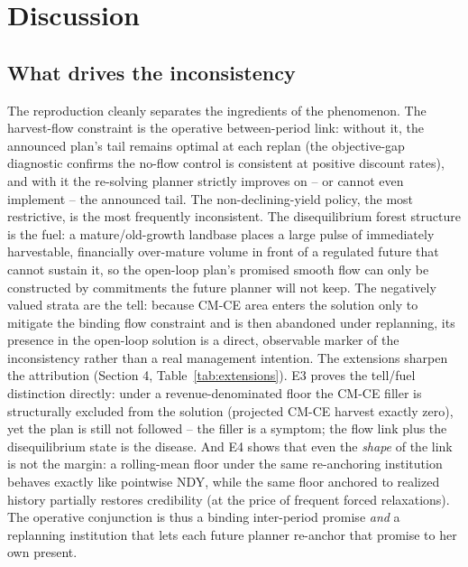 \section{Discussion}

\hypertarget{what-drives-the-inconsistency}{%
\subsection{What drives the inconsistency}\label{what-drives-the-inconsistency}}

The reproduction cleanly separates the ingredients of the phenomenon. The harvest-flow constraint is the operative between-period link: without it, the announced plan's tail remains optimal at each replan (the objective-gap diagnostic confirms the no-flow control is consistent at positive discount rates), and with it the re-solving planner strictly improves on -- or cannot even implement -- the announced tail. The non-declining-yield policy, the most restrictive, is the most frequently inconsistent. The disequilibrium forest structure is the fuel: a mature/old-growth landbase places a large pulse of immediately harvestable, financially over-mature volume in front of a regulated future that cannot sustain it, so the open-loop plan's promised smooth flow can only be constructed by commitments the future planner will not keep. The negatively valued strata are the tell: because CM-CE area enters the solution only to mitigate the binding flow constraint and is then abandoned under replanning, its presence in the open-loop solution is a direct, observable marker of the inconsistency rather than a real management intention. The extensions sharpen the attribution (Section 4, Table~\ref{tab:extensions}). E3 proves the tell/fuel distinction directly: under a revenue-denominated floor the CM-CE filler is structurally excluded from the solution (projected CM-CE harvest exactly zero), yet the plan is still not followed -- the filler is a symptom; the flow link plus the disequilibrium state is the disease. And E4 shows that even the \emph{shape} of the link is not the margin: a rolling-mean floor under the same re-anchoring institution behaves exactly like pointwise NDY, while the same floor anchored to realized history partially restores credibility (at the price of frequent forced relaxations). The operative conjunction is thus a binding inter-period promise \emph{and} a replanning institution that lets each future planner re-anchor that promise to her own present.

